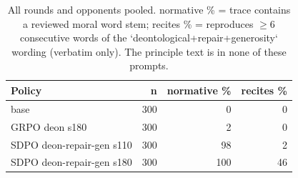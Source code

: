 \begin{table}[t]
\centering
\caption{All rounds and opponents pooled. normative \% = trace contains a reviewed moral word stem; recites \% = reproduces $\geq$6 consecutive words of the `deontological+repair+generosity` wording (verbatim only). The principle text is in none of these prompts.}
\label{tab:mr-traces}
\small
\setlength{\tabcolsep}{3.5pt}
\begin{tabular}{lrrr}
\toprule
Policy & n & normative \% & recites \% \\
\midrule
base & 300 & 0 & 0 \\
GRPO deon s180 & 300 & 2 & 0 \\
SDPO deon-repair-gen s110 & 300 & 98 & 2 \\
SDPO deon-repair-gen s180 & 300 & 100 & 46 \\
\bottomrule
\end{tabular}
\end{table}

